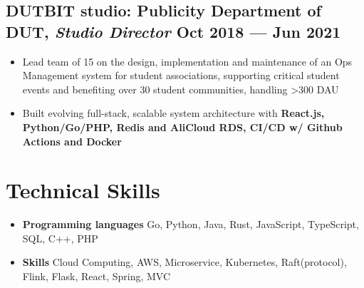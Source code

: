 \documentclass[a4,12pt]{article}
\newenvironment{zitemize}{
\begin{itemize}\itemsep0pt \parskip0pt \parsep1pt}
{\end{itemize}\vspace{-0.5cm}}
\begin{document}
\vspace{-0.1cm}

\subsection*{DUTBIT studio: {\normalsize\normalfont Publicity Department of DUT, \textit{Studio Director}} \hfill  Oct 2018 --- Jun 2021} 

    \begin{zitemize}
        \item Lead team of 15 on the design, implementation and maintenance of an Ops Management system for student associations, supporting critical student events and benefiting over 30 student communities, handling >300 DAU
        \item Built evolving full-stack, scalable system architecture with \textbf{React.js, Python/Go/PHP, Redis and AliCloud RDS, CI/CD w/ Github Actions and Docker}
    \end{zitemize}

\vspace{-0.4cm}
\section{\textbf{Technical Skills}}
\vspace{-0.2cm}
\begin{zitemize}
    \item \textbf{Programming languages} Go, Python, Java, Rust, JavaScript, TypeScript, SQL, C++, PHP
    \item \textbf{Skills} Cloud Computing, AWS, Microservice, Kubernetes, Raft(protocol), Flink, Flask, React, Spring, MVC
\end{zitemize}
\end{document}
